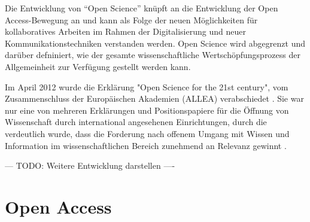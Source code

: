 Die Entwicklung von “Open Science” knüpft an die Entwicklung der Open Access-Bewegung an und kann als Folge der neuen Möglichkeiten für kollaboratives Arbeiten im Rahmen der Digitalisierung und neuer Kommunikationstechniken verstanden werden. Open Science wird abgegrenzt und darüber defniniert, wie der gesamte wissenschaftliche Wertschöpfungsprozess der Allgemeinheit zur Verfügung gestellt werden kann. 

Im April 2012 wurde die Erklärung "Open Science for the 21st century", vom Zusammenschluss der Europäischen Akademien (ALLEA) verabschiedet \cite{ALLEA_2012}. Sie war nur eine von mehreren Erklärungen und Positionspapiere für die Öffnung von Wissenschaft durch international angesehenen Einrichtungen, durch die verdeutlich wurde, dass die Forderung nach offenem Umgang mit Wissen und Information im wissenschaftlichen Bereich zunehmend an Relevanz gewinnt \cite{schulze_2013_open}.

--- TODO: Weitere Entwicklung darstellen ----

\section{Open Access} 

